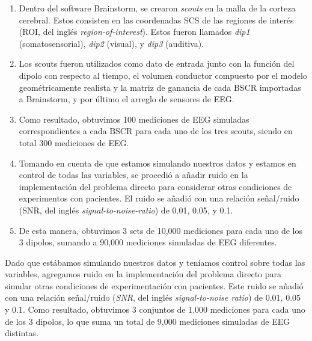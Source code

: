 \begin{enumerate}
	\item Dentro del software Brainstorm, se crearon \emph{scouts} en la malla de la corteza cerebral. Estos consisten en las coordenadas SCS de las regiones de interés (ROI, del inglés \emph{region-of-interest}). Estos fueron llamados \emph{dip1} (somatosensorial), \emph{dip2} (visual), y \emph{dip3} (auditiva).
	\item Los scouts fueron utilizados como dato de entrada junto con la función del dipolo con respecto al tiempo, el volumen conductor compuesto por el modelo geométricamente realista y la matriz de ganancia de cada BSCR importadas a Brainstorm, y por último el arreglo de sensores de EEG.
	\item Como resultado, obtuvimos 100 mediciones de EEG simuladas correspondientes a cada BSCR para cada uno de los tres scouts, siendo en total 300 mediciones de EEG.
	\item Tomando en cuenta de que estamos simulando nuestros datos y estamos en control de todas las variables, se procedió a añadir ruido en la implementación del problema directo para considerar otras condiciones de experimentos con pacientes. El ruido se añadió con una relación señal/ruido (SNR, del inglés \emph{signal-to-noise-ratio}) de 0.01, 0.05, y 0.1.
	\item De esta manera, obtuvimos 3 sets de 10,000 mediciones para cada uno de los 3 dipolos, sumando a 90,000 mediciones simuladas de EEG diferentes.
\end{enumerate}

Dado que estábamos simulando nuestros datos y teníamos control sobre todas las variables, agregamos ruido en la implementación del problema directo para simular otras condiciones de experimentación con pacientes. Este ruido se añadió con una relación señal/ruido (\emph{SNR}, del inglés \emph{signal-to-noise ratio}) de 0.01, 0.05 y 0.1. Como resultado, obtuvimos 3 conjuntos de 1,000 mediciones para cada uno de los 3 dipolos, lo que suma un total de 9,000 mediciones simuladas de EEG distintas.

